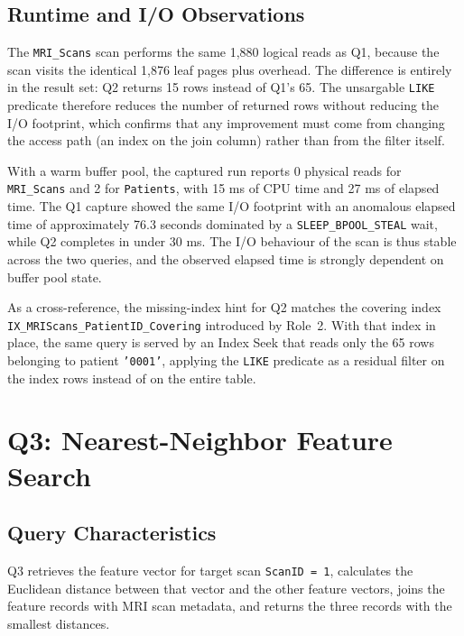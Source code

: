 \subsection{Runtime and I/O Observations}

The \texttt{MRI\_Scans} scan performs the same 1,880 logical reads as Q1, because the scan visits the identical 1,876 leaf pages plus overhead. The difference is entirely in the result set: Q2 returns 15 rows instead of Q1's 65. The unsargable \texttt{LIKE} predicate therefore reduces the number of returned rows without reducing the I/O footprint, which confirms that any improvement must come from changing the access path (an index on the join column) rather than from the filter itself.

With a warm buffer pool, the captured run reports 0 physical reads for \texttt{MRI\_Scans} and 2 for \texttt{Patients}, with 15 ms of CPU time and 27 ms of elapsed time. The Q1 capture showed the same I/O footprint with an anomalous elapsed time of approximately 76.3 seconds dominated by a \texttt{SLEEP\_BPOOL\_STEAL} wait, while Q2 completes in under 30 ms. The I/O behaviour of the scan is thus stable across the two queries, and the observed elapsed time is strongly dependent on buffer pool state.

As a cross-reference, the missing-index hint for Q2 matches the covering index \texttt{IX\_MRIScans\_PatientID\_Covering} introduced by Role~2. With that index in place, the same query is served by an Index Seek that reads only the 65 rows belonging to patient \texttt{'0001'}, applying the \texttt{LIKE} predicate as a residual filter on the index rows instead of on the entire table.


\section{Q3: Nearest-Neighbor Feature Search}

\subsection{Query Characteristics}

Q3 retrieves the feature vector for target scan \texttt{ScanID = 1}, calculates the Euclidean distance between that vector and the other feature vectors, joins the feature records with MRI scan metadata, and returns the three records with the smallest distances.


